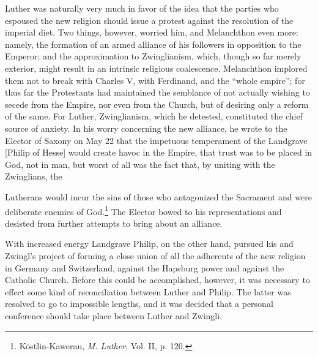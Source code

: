Luther was naturally very much in favor of the idea that the
parties who espoused the new religion should issue a protest against
the resolution of the imperial diet. Two things, however, worried
him, and Melanchthon even more: namely, the formation of an
armed alliance of his followers in opposition to the Emperor; and the
approximation to Zwinglianism, which, though so far merely exterior, might
result in an intrinsic religious coalescence. Melanchthon
implored them not to break with Charles V, with Ferdinand, and
the “whole empire”; for thus far the Protestants had maintained
the semblance of not actually wishing to secede from the Empire,
nor even from the Church, but of desiring only a reform of the
same. For Luther, Zwinglianism, which he detested, constituted the
chief source of anxiety. In his worry concerning the new alliance,
he wrote to the Elector of Saxony on May 22 that the impetuous
temperament of the Landgrave [Philip of Hesse] would create havoc
in the Empire, that trust was to be placed in God, not in man, but
worst of all was the fact that, by uniting with the Zwinglians, the

Lutherans would incur the sins of those who antagonized the Sacrament
and were deliberate enemies of God.\footnote{Köstlin-Kawerau, \textit{M. Luther}, Vol. II, p. 120.}
The Elector bowed to
his representations and desisted from further attempts to bring about
an alliance.

With increased energy Landgrave Philip, on the other hand, pursued his
and Zwingl’s project of forming a close union of all the
adherents of the new religion in Germany and Switzerland, against
the Hapsburg power and against the Catholic Church. Before this
could be accomplished, however, it was necessary to effect some kind
of reconciliation between Luther and Philip. The latter was resolved
to go to impossible lengths, and it was decided that a personal conference
should take place between Luther and Zwingli.
